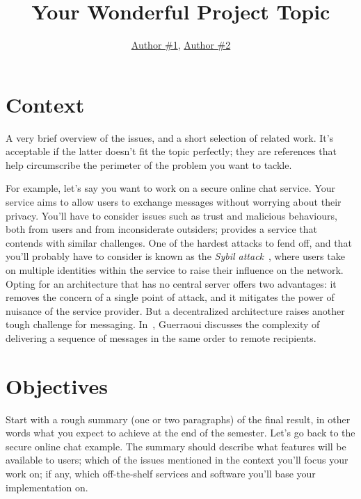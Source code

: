 \documentclass{article}
\title{Your Wonderful Project Topic}
\author{\href{mailto:author1@nyu.edu}{Author \#1}, \href{mailto:author2@nyu.edu}{Author \#2}}
\date{\vspace{-5ex}} %
\begin{document}
\maketitle
\thispagestyle{firstpage}

\section*{Context}

A very brief overview of the issues, and a short selection of related work. It's acceptable if the latter doesn't fit the topic perfectly; they are references that help circumscribe the perimeter of the problem you want to tackle. 

For example, let's say you want to work on a secure online chat service. Your service aims to allow users to exchange messages without worrying about their privacy. 
You'll have to consider issues such as trust and malicious behaviours, both from users and from inconsiderate outsiders; \cite{byzantine-pki} provides a service that contends with similar challenges. One of the hardest attacks to fend off, and that you'll probably have to consider is known as the \textit{Sybil attack}~\cite{sybilattack}, where users take on multiple identities within the service to raise their influence on the network. Opting for an architecture that has no central server offers two advantages: it removes the concern of a single point of attack, and it mitigates the power of nuisance of the service provider. But a decentralized architecture raises another tough challenge for messaging. In~\cite{atomic-mcast-tcs01}, Guerraoui discusses the complexity of delivering a sequence of messages in the same order to remote recipients.


\section*{Objectives}

Start with a rough summary (one or two paragraphs) of the final result, in other words what you expect to achieve at the end of the semester. Let's go back to the secure online chat example. The summary should describe what features will be available to users; which of the issues mentioned in the context you'll focus your work on; if any, which off-the-shelf services and software you'll base your implementation on.
\end{document}
